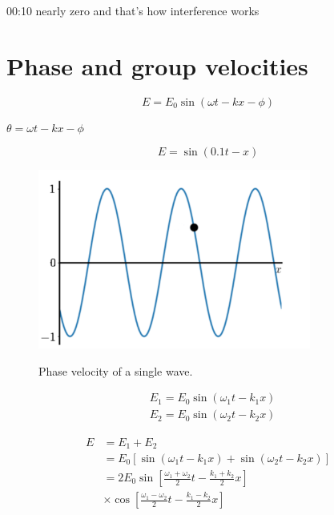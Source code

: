 00:10
nearly zero and that's how interference works

\section{Phase and group velocities}

\begin{equation}
E=E_{0} \sin (\omega t-k x-\phi)
\end{equation}


$\theta=\omega t-k x-\phi$

\begin{equation}
E=\sin (0.1 t-x)
\end{equation}

\begin{figure}[H]
   \centering
    \includegraphics[width=0.8\textwidth]{lesson6/black_dot.pdf}
    \label{fig: 1}
    \begin{center}
        \caption{Phase velocity of a single wave.}
    \end{center}
\end{figure}

\begin{equation}
\begin{aligned}
&E_{1}=E_{0} \sin \left(\omega_{1} t-k_{1} x\right) \\
&E_{2}=E_{0} \sin \left(\omega_{2} t-k_{2} x\right)
\end{aligned}
\end{equation}

\begin{equation}
\begin{aligned}
E &=E_{1}+E_{2} \\
&=E_{0}\left[\sin \left(\omega_{1} t-k_{1} x\right)+\sin \left(\omega_{2} t-k_{2} x\right)\right] \\
&=2 E_{0} \sin \left[\frac{\omega_{1}+\omega_{2}}{2} t-\frac{k_{1}+k_{2}}{2} x\right] \\
& \times \cos \left[\frac{\omega_{1}-\omega_{2}}{2} t-\frac{k_{1}-k_{2}}{2} x\right]
\end{aligned}
\end{equation}

